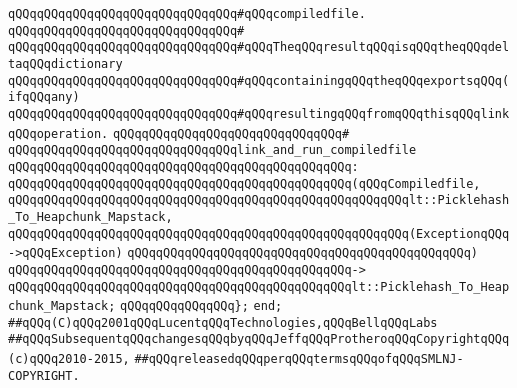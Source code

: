 \verb|qQQqqQQqqQQqqQQqqQQqqQQqqQQqqQQq#qQQqcompiledfile.|\newline
\verb|qQQqqQQqqQQqqQQqqQQqqQQqqQQqqQQq#|\newline
\verb|qQQqqQQqqQQqqQQqqQQqqQQqqQQqqQQq#qQQqTheqQQqresultqQQqisqQQqtheqQQqdeltaqQQqdictionary|\newline
\verb|qQQqqQQqqQQqqQQqqQQqqQQqqQQqqQQq#qQQqcontainingqQQqtheqQQqexportsqQQq(ifqQQqany)|\newline
\verb|qQQqqQQqqQQqqQQqqQQqqQQqqQQqqQQq#qQQqresultingqQQqfromqQQqthisqQQqlinkqQQqoperation.|\newline
\verb|qQQqqQQqqQQqqQQqqQQqqQQqqQQqqQQq#|\newline
\verb|qQQqqQQqqQQqqQQqqQQqqQQqqQQqqQQqlink_and_run_compiledfile|\newline
\verb|qQQqqQQqqQQqqQQqqQQqqQQqqQQqqQQqqQQqqQQqqQQqqQQq:|\newline
\verb|qQQqqQQqqQQqqQQqqQQqqQQqqQQqqQQqqQQqqQQqqQQqqQQq(qQQqCompiledfile,|\newline
\verb|qQQqqQQqqQQqqQQqqQQqqQQqqQQqqQQqqQQqqQQqqQQqqQQqqQQqqQQqlt::Picklehash_To_Heapchunk_Mapstack,|\newline
\verb|qQQqqQQqqQQqqQQqqQQqqQQqqQQqqQQqqQQqqQQqqQQqqQQqqQQqqQQq(ExceptionqQQq->qQQqException)|\newline
\verb|qQQqqQQqqQQqqQQqqQQqqQQqqQQqqQQqqQQqqQQqqQQqqQQq)|\newline
\verb|qQQqqQQqqQQqqQQqqQQqqQQqqQQqqQQqqQQqqQQqqQQqqQQq->|\newline
\verb|qQQqqQQqqQQqqQQqqQQqqQQqqQQqqQQqqQQqqQQqqQQqqQQqlt::Picklehash_To_Heapchunk_Mapstack;|\newline
\verb|qQQqqQQqqQQqqQQq};|\newline
\verb|end;|\newline
\newline
\newline
\verb|##qQQq(C)qQQq2001qQQqLucentqQQqTechnologies,qQQqBellqQQqLabs|\newline
\verb|##qQQqSubsequentqQQqchangesqQQqbyqQQqJeffqQQqProtheroqQQqCopyrightqQQq(c)qQQq2010-2015,|\newline
\verb|##qQQqreleasedqQQqperqQQqtermsqQQqofqQQqSMLNJ-COPYRIGHT.|\newline

